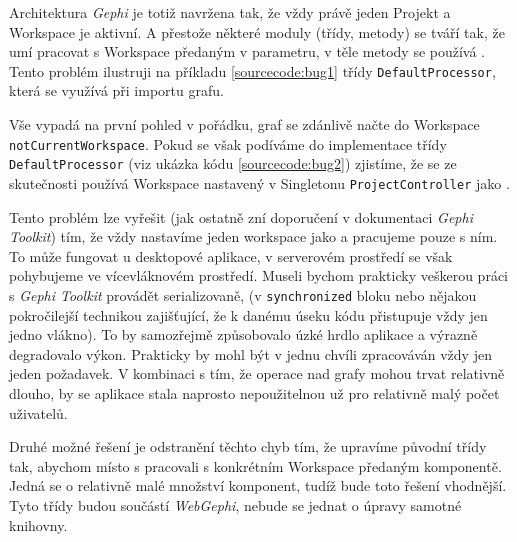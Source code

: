 \documentclass[thesis=M,czech]{FITthesis}[2014/05/6]
\begin{document}
 \textit{\cite{gephi:toolkit}}
 
 Architektura \textit{Gephi} je totiž navržena tak, že vždy právě jeden Projekt a Workspace je aktivní. A přestože některé moduly (třídy, metody) se tváří tak,
 že umí pracovat s Workspace předaným v parametru, v těle metody se používá . Tento problém ilustruji na příkladu \ref{sourcecode:bug1} třídy \texttt{DefaultProcessor}, která se
 využívá při importu grafu.
 
 
 
 Vše vypadá na první pohled v pořádku, graf se zdánlivě načte do Workspace \texttt{notCurrentWorkspace}. Pokud se však podíváme do implementace třídy \texttt{DefaultProcessor} (viz ukázka kódu \ref{sourcecode:bug2}) zjistíme, že 
 se ze skutečnosti používá Workspace nastavený v Singletonu \texttt{ProjectController} jako .


  
 Tento problém lze vyřešit (jak ostatně zní doporučení v dokumentaci \textit{Gephi Toolkit}) tím, že vždy nastavíme jeden workspace jako  a pracujeme pouze s ním.
 To může fungovat u desktopové aplikace, v serverovém prostředí se však pohybujeme ve vícevláknovém prostředí. Museli bychom prakticky veškerou práci s \textit{Gephi Toolkit}
 provádět serializovaně, (v \texttt{synchronized} bloku nebo nějakou pokročilejší technikou zajišťující, že k danému úseku kódu přistupuje vždy jen jedno vlákno). To
 by samozřejmě způsobovalo úzké hrdlo aplikace a výrazně degradovalo výkon. Prakticky by mohl být v jednu chvíli zpracováván vždy jen jeden požadavek.
 V kombinaci s tím, že operace nad grafy mohou trvat relativně dlouho, by se aplikace stala naprosto nepoužitelnou už pro relativně malý počet uživatelů.
 
 Druhé možné řešení je odstranění těchto chyb tím, že upravíme původní třídy tak, abychom místo s  pracovali s konkrétním Workspace předaným komponentě.
 Jedná se o relativně malé množství komponent, tudíž bude toto řešení vhodnější. Tyto třídy budou součástí \textit{WebGephi}, nebude se jednat o úpravy samotné knihovny.
 
\end{document}

